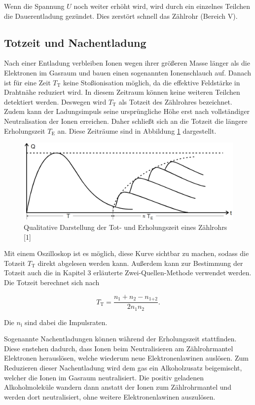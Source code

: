 Wenn die Spannung $U$ noch weiter erhöht wird, wird durch ein einzelnes Teilchen 
die Dauerentladung gezündet. Dies zerstört schnell das Zählrohr (Bereich V). 

\subsection{Totzeit und Nachentladung}

Nach einer Entladung verbleiben Ionen wegen ihrer größeren Masse länger als 
die Elektronen im Gasraum und bauen einen sogenannten Ionenschlauch auf. 
Danach ist für eine Zeit $T_\text{T}$ keine Stoßionisation möglich, da die 
effektive Feldstärke in Drahtnähe reduziert wird. In diesem Zeitraum können 
keine weiteren Teilchen detektiert werden. Deswegen wird $T_\text{T}$ als 
Totzeit des Zählrohres bezeichnet. Zudem kann der Ladungsimpuls seine 
ursprüngliche Höhe erst nach vollständiger Neutralisation der Ionen erreichen. 
Daher schließt sich an die Totzeit die längere Erholungszeit $T_\text{E}$ 
an. Diese Zeiträume sind in Abbildung \ref{fig:Totzeit} dargestellt. 

\begin{figure}
  \centering
  \includegraphics[scale=0.3]{content/Totzeit.png}
  \caption{Qualitative Darstellung der Tot- und Erholungszeit eines Zählrohrs [1]}
  \label{fig:Totzeit}
\end{figure}

Mit einem Oszilloskop ist es möglich, diese Kurve sichtbar zu machen, sodass die
Totzeit $T_\text{T}$ direkt abgelesen werden kann. Außerdem kann zur Bestimmung 
der Totzeit auch die in Kapitel 3 erläuterte Zwei-Quellen-Methode verwendet werden. 
Die Totzeit berechnet sich nach 

\begin{equation}
T_\text{T} = \frac{n_1+n_2-n_\text{1+2}}{2n_1n_2}.
\end{equation}

Die $n_\text{i}$ sind dabei die Impulsraten.

Sogenannte Nachentladungen können während der Erholungszeit stattfinden. Diese 
enstehen dadurch, dass Ionen beim Neutralisieren am Zählrohrmantel Elektronen 
herauslösen, welche wiederum neue Elektronenlawinen auslösen. Zum Reduzieren 
dieser Nachentladung wird dem gas ein Alkoholzusatz beigemischt, welcher die 
Ionen im Gasraum neutralisiert. Die positiv geladenen Alkoholmoleküle wandern
dann anstatt der Ionen zum Zählrohrmantel und werden dort neutralisiert, ohne 
weitere Elektronenlawinen auszulösen. 